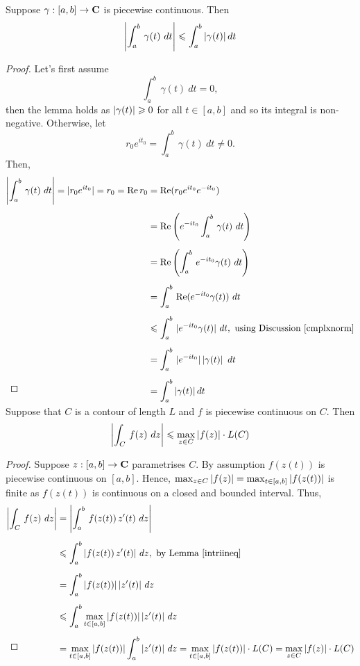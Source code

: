 \begin{lemma}\label{intriineq}
Suppose $\gamma:[a,b] \to \mathbf C$ is piecewise continuous. Then
\[\abs{\int_a^b\,\gamma(t)\ dt} \leq \int_a^b\abs{\gamma(t)}dt\]
\end{lemma}
\begin{proof}
Let's first assume 
\[\int_a^b\,\gamma(t)\ dt = 0,\]
then the lemma holds as $\left\lvert\gamma(t)\right\rvert \geqslant 0$ for all $t \in [a,b]$ and so its integral is non-negative. Otherwise, let \[r_0e^{it_0} = \int_a^b\,\gamma(t)\ dt \neq 0.\] Then,
\begin{align*}
\left\lvert\int_a^b\,\gamma(t)\ dt\right\rvert = |r_0e^{it_0}| = r_0 = \operatorname{Re} r_0 &= \operatorname{Re} (r_0e^{it_0}e^{-it_0})\\[0.5em]
&= \operatorname{Re} \left(e^{-it_0}\int_a^b\,\gamma(t)\ dt\right)\\[0.5em]
&= \operatorname{Re} \left(\int_a^b\,e^{-it_0}\gamma(t)\ dt\right)\\[0.5em]
&= \int_a^b\,\operatorname{Re} (e^{-it_0}\gamma(t))\ dt\\[0.5em]
&\leqslant \int_a^b\,|e^{-it_0}\gamma(t)|\ dt,\ \text{using Discussion \ref{cmplxnorm}}\\[0.5em]
&= \int_a^b\,|e^{-it_0}|\left\lvert\gamma(t)\right\rvert\ dt\\[0.5em]
&= \int_a^b\left\lvert\gamma(t)\right\rvert dt\\[-3em]
\end{align*}
\end{proof}

\vspace*{1em}

\begin{theorem}\label{contourtriineq}
Suppose that $C$ is a contour of length $L$ and $f$ is piecewise continuous on $C$. Then
\[\left\lvert\int_C\,f(z)\ dz\right\rvert \leqslant \max_{z \in C}\left\lvert f(z)\right\rvert \cdot L(C)\]
\end{theorem}
\begin{proof}
Suppose $z:[a,b] \to \mathbf C$ parametrises $C$. By assumption $f(z(t))$ is piecewise continuous on $[a,b]$. Hence, $\max_{z \in C}\left\lvert f(z)\right\rvert = \max_{t \in [a,b]}\left\lvert f(z(t))\right\rvert$ is finite as $f(z(t))$ is continuous on a closed and bounded interval. Thus,
\begin{align*}
\abs{\int_C\,f(z)\ dz} &= \abs{\int_a^b\,f(z(t))\,z'(t)\ dz}\\[0.5em]
 &\leq \int_a^b\abs{f(z(t))\,z'(t)}\, dz,\ \text{by Lemma \ref{intriineq}}\\[0.5em]
 &= \int_a^b\abs{f(z(t))}\abs{z'(t)}\, dz\\[0.5em]
 &\leq \int_a^b\max_{t \in [a,b]}\abs{f(z(t))}\abs{z'(t)}\, dz\\[0.5em]
 &= \max_{t \in [a,b]}\abs{f(z(t))}\int_a^b\abs{z'(t)}\, dz = \max_{t \in [a,b]}\abs{f(z(t))}\cdot L(C) = \max_{z \in C}\abs{f(z)}\cdot L(C)\\[-3em]
\end{align*}
\end{proof}

